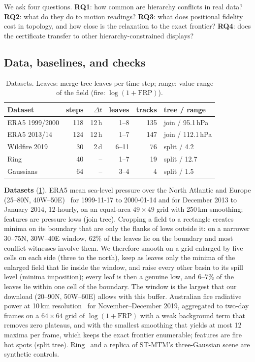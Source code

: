 \documentclass[review]{vgtc}                 %
\begin{document}
We ask four questions. \textbf{RQ1}: how common are hierarchy conflicts in real data? \textbf{RQ2}: what do they do to motion readings? \textbf{RQ3}: what does positional fidelity cost in topology, and how close is the relaxation to the exact frontier? \textbf{RQ4}: does the certificate transfer to other hierarchy-constrained displays?

\subsection{Data, baselines, and checks}

\begin{table}[t]
\centering\small
\setlength{\tabcolsep}{3.5pt}
\begin{tabular}{lrrrrl}\toprule
Dataset & steps & $\Delta t$ & leaves & tracks & tree / range\\\midrule
ERA5 1999/2000 & 118 & 12\,h & 1--8 & 135 & join / 95.1\,hPa\\
ERA5 2013/14 & 124 & 12\,h & 1--7 & 147 & join / 112.1\,hPa\\
Wildfire 2019 & 30 & 2\,d & 6--11 & 76 & split / 4.2\\
Ring & 40 & -- & 1--7 & 19 & split / 12.7\\
Gaussians & 64 & -- & 3--4 & 4 & split / 1.5\\\bottomrule
\end{tabular}
\caption{Datasets. Leaves: merge-tree leaves per time step; range: value range of the field (fire: $\log(1+\mathrm{FRP})$).}
\label{tab:data}
\end{table}

\textbf{Datasets} (\cref{tab:data}). ERA5 mean sea-level pressure over the North Atlantic and Europe (25--80\textdegree N, 40\textdegree W--50\textdegree E)~\cite{Hersbach:2020:ERA5} for 1999-11-17 to 2000-01-14 and for December 2013 to January 2014, 12-hourly, on an equal-area $49\times49$ grid with 250\,km smoothing; features are pressure lows (join tree). Cropping a field to a rectangle creates minima on its boundary that are only the flanks of lows outside it: on a narrower 30--75\textdegree N, 30\textdegree W--40\textdegree E window, 62\% of the leaves lie on the boundary and most conflict witnesses involve them. We therefore smooth on a grid enlarged by five cells on each side (three to the north), keep as leaves only the minima of the enlarged field that lie inside the window, and raise every other basin to its spill level (minima imposition); every leaf is then a genuine low, and 6--7\% of the leaves lie within one cell of the boundary. The window is the largest that our download (20--90\textdegree N, 50\textdegree W--60\textdegree E) allows with this buffer. Australian fire radiative power at 10\,km resolution~\cite{Franke:2021:1DP} for November--December 2019, aggregated to two-day frames on a $64\times64$ grid of $\log(1+\mathrm{FRP})$ with a weak background term that removes zero plateaus, and with the smallest smoothing that yields at most 12 maxima per frame, which keeps the exact frontier enumerable; features are fire hot spots (split tree). Ring~\cite{Koepp:2023:TMTM,Franke:2021:1DP} and a replica of ST-MTM's three-Gaussian scene are synthetic controls.
\end{document}
